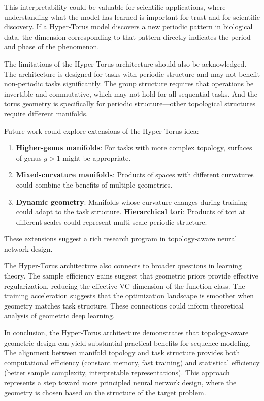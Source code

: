 \documentclass[12pt,letterpaper,twoside]{article}
\begin{document}
This interpretability could be valuable for scientific applications, where understanding what the model has learned is important for trust and for scientific discovery. If a Hyper-Torus model discovers a new periodic pattern in biological data, the dimension corresponding to that pattern directly indicates the period and phase of the phenomenon.

The limitations of the Hyper-Torus architecture should also be acknowledged. The architecture is designed for tasks with periodic structure and may not benefit non-periodic tasks significantly. The group structure requires that operations be invertible and commutative, which may not hold for all sequential tasks. And the torus geometry is specifically for periodic structure—other topological structures require different manifolds.

Future work could explore extensions of the Hyper-Torus idea:
\begin{enumerate}
    \item \textbf{Higher-genus manifolds}: For tasks with more complex topology, surfaces of genus $g > 1$ might be appropriate.
    \item \textbf{Mixed-curvature manifolds}: Products of spaces with different curvatures could combine the benefits of multiple geometries.
    \item \textbf{Dynamic geometry}: Manifolds whose curvature changes during training could adapt to the task structure.
    \textbf{Hierarchical tori}: Products of tori at different scales could represent multi-scale periodic structure.
\end{enumerate}
These extensions suggest a rich research program in topology-aware neural network design.

The Hyper-Torus architecture also connects to broader questions in learning theory. The sample efficiency gains suggest that geometric priors provide effective regularization, reducing the effective VC dimension of the function class. The training acceleration suggests that the optimization landscape is smoother when geometry matches task structure. These connections could inform theoretical analysis of geometric deep learning.

In conclusion, the Hyper-Torus architecture demonstrates that topology-aware geometric design can yield substantial practical benefits for sequence modeling. The alignment between manifold topology and task structure provides both computational efficiency (constant memory, fast training) and statistical efficiency (better sample complexity, interpretable representations). This approach represents a step toward more principled neural network design, where the geometry is chosen based on the structure of the target problem.
\end{document}
